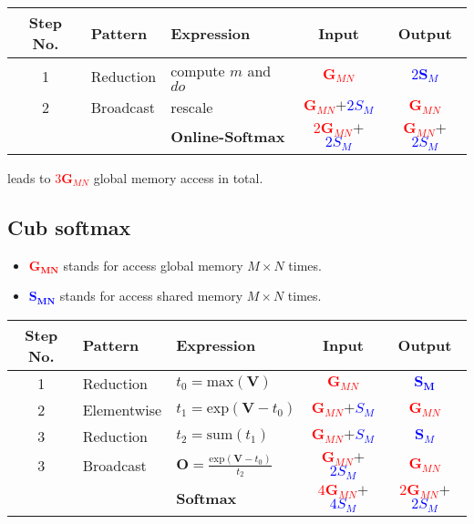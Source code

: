\begin{tabular}{c|llcc}
    \toprule
    \textbf{Step No.}&\textbf{Pattern}&\textbf{Expression}&\textbf{Input}&\textbf{Output}\\\midrule
    1 & Reduction & compute $m$ and $do$&\textcolor{red}{$\mathbf{G}_{MN}$}&\textcolor{blue}{$2\mathbf{S}_M$}\\
    2 & Broadcast & rescale&\textcolor{red}{$\mathbf{G}_{MN}$}$+$\textcolor{blue}{$2S_M$}&\textcolor{red}{$\mathbf{G}_{MN}$}\\\midrule
    &&\textbf{\textcolor{byzantium}{Online-Softmax}}&\textcolor{red}{$2\mathbf{G}_{MN}$}$+$\textcolor{blue}{$2S_M$}&\textcolor{red}{$\mathbf{G}_{MN}$}$+$\textcolor{blue}{$2S_M$}\\
    \bottomrule
\end{tabular}

leads to \textcolor{red}{$3\mathbf{G}_{MN}$} global memory access in total.

\subsection{Cub softmax}

\begin{itemize}
    \item \textcolor{red}{$\mathbf{G_{MN}}$} stands for access global memory $M\times N$ times.
    \item \textcolor{blue}{$\mathbf{S_{MN}}$} stands for access shared memory $M\times N$ times.
\end{itemize}

\begin{tabular}{c|llcc}
    \toprule
    \textbf{Step No.}&\textbf{Pattern}&\textbf{Expression}&\textbf{Input}&\textbf{Output}\\\midrule
    1 & Reduction & $t_0 = \text{max}(\mathbf{V})$ &\textcolor{red}{$\mathbf{G}_{MN}$}&\textcolor{blue}{$\mathbf{S_M}$}\\
    2 & Elementwise & $t_1 = \text{exp}(\mathbf{V} - t_0)$&\textcolor{red}{$\mathbf{G}_{MN}$}$+$\textcolor{blue}{$S_M$}&\textcolor{red}{$\mathbf{G}_{MN}$}\\
    3 & Reduction & $t_2 = \text{sum}(t_1)$&\textcolor{red}{$\mathbf{G}_{MN}$}$+$\textcolor{blue}{$S_M$}&\textcolor{blue}{$\mathbf{S}_{M}$}\\
    3 & Broadcast & $\mathbf{O} = \frac{\text{exp}(\mathbf{V}-t_0)}{t_2}$&\textcolor{red}{$\mathbf{G}_{MN}$}$+$\textcolor{blue}{$2S_M$}&\textcolor{red}{$\mathbf{G}_{MN}$}\\\midrule
    &&\textbf{\textcolor{byzantium}{Softmax}}&\textcolor{red}{$4\mathbf{G}_{MN}$}$+$\textcolor{blue}{$4S_M$}&\textcolor{red}{$2\mathbf{G}_{MN}$}$+$\textcolor{blue}{$2S_M$}\\
    \bottomrule
\end{tabular}

